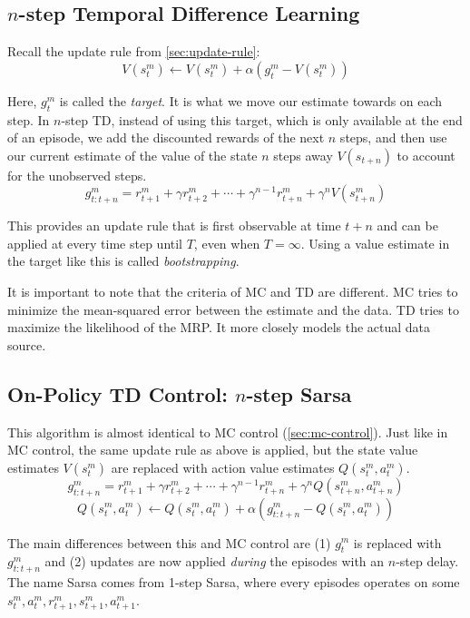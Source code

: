 \documentclass{article}
\begin{document}
\subsection{$n$-step Temporal Difference Learning}
Recall the update rule from \ref{sec:update-rule}:
\begin{equation}
  V(s_t^m) \leftarrow V(s_t^m) + \alpha (g_t^m - V(s_t^m))
\end{equation}

Here, $g_t^m$ is called the \emph{target}. It is what we move our estimate towards on each step. In $n$-step TD, instead of using this target,
which is only available at the end of an episode, we add the discounted rewards of the next $n$ steps, and then use our current estimate 
of the value of the state $n$ steps away $V(s_{t+n})$ to account for the unobserved steps.
\begin{equation}
  g_{t:t+n}^m = r_{t+1}^m + \gamma r_{t+2}^m + \cdots + \gamma^{n-1} r_{t+n}^m + \gamma^n V(s_{t+n}^m)
\end{equation}

This provides an update rule that is first observable at time $t+n$ and can be applied at every time step until $T$, even when $T = \infty$. 
Using a value estimate in the target like this is called \emph{bootstrapping}.

It is important to note that the criteria of MC and TD are different. MC tries to minimize the mean-squared error between the estimate and the data.
TD tries to maximize the likelihood of the MRP. It more closely models the actual data source.

\subsection{On-Policy TD Control: $n$-step Sarsa}
This algorithm is almost identical to MC control (\ref{sec:mc-control}). Just like in MC control, the same update rule as above is applied, 
but the state value estimates $V(s_t^m)$ are replaced with action value estimates $Q(s_t^m, a_t^m)$.
\begin{equation}
  g_{t:t+n}^m = r_{t+1}^m + \gamma r_{t+2}^m + \cdots + \gamma^{n-1} r_{t+n}^m + \gamma^n Q(s_{t+n}^m, a_{t+n}^m) \label{eq:n-td-update}
\end{equation}
\begin{equation}
  Q(s_t^m, a_t^m) \leftarrow Q(s_t^m, a_t^m) + \alpha (g_{t:t+n}^m - Q(s_t^m, a_t^m))
\end{equation}

The main differences between this and MC control are (1) $g_t^m$ is replaced with $g_{t:t+n}^m$ and (2) updates are now applied \emph{during} the
episodes with an $n$-step delay. The name Sarsa comes from 1-step Sarsa, where every episodes operates on some $s_t^m, a_t^m, r_{t+1}^m, s_{t+1}^m, a_{t+1}^m$.
\end{document}
